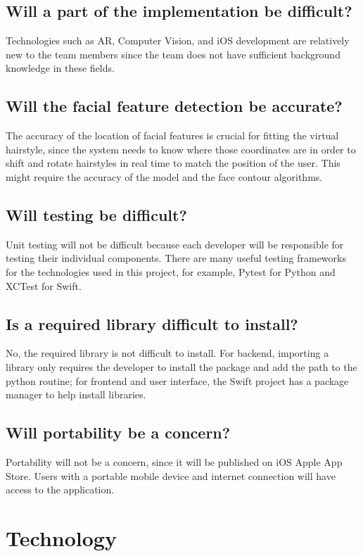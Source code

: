 \documentclass{article}
\begin{document}
\subsection{Will a part of the implementation be difficult?}
Technologies such as AR, Computer Vision, and iOS development are relatively new to the team members since the team does not have sufficient background knowledge in these fields.

\subsection{Will the facial feature detection be accurate?}
The accuracy of the location of facial features is crucial for fitting the virtual hairstyle, since the system needs to know where those coordinates are in order to shift and rotate hairstyles in real time to match the position of the user. This might require the accuracy of the model and the face contour algorithms.

\subsection{Will testing be difficult?}
Unit testing will not be difficult because each developer will be responsible for testing their individual components. There are many useful testing frameworks for the technologies used in this project, for example, Pytest for Python and XCTest for Swift.

\subsection{Is a required library difficult to install?}
No, the required library is not difficult to install. For backend, importing a library only requires the developer to install the package and add the path to the python routine; for frontend and user interface, the Swift project has a package manager to help install libraries.

\subsection{Will portability be a concern?}
Portability will not be a concern, since it will be published on iOS Apple App Store. Users with a portable mobile device and internet connection will have access to the application.

\section{Technology}
\end{document}
